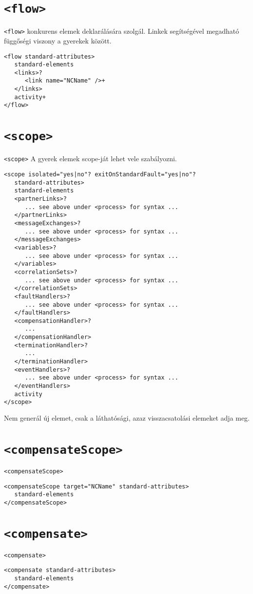 \section{\texttt{<flow>}}
\texttt{<flow>} konkurens elemek deklarálására szolgál. Linkek segítségével megadható függőségi viszony a gyerekek között. 
\begin{verbatim}
<flow standard-attributes>
   standard-elements
   <links>?
      <link name="NCName" />+
   </links>
   activity+
</flow>
\end{verbatim} 

\section{\texttt{<scope>}}
\texttt{<scope>} A gyerek elemek scope-ját lehet vele szabályozni.
\begin{verbatim}
<scope isolated="yes|no"? exitOnStandardFault="yes|no"?
   standard-attributes>
   standard-elements
   <partnerLinks>?
      ... see above under <process> for syntax ...
   </partnerLinks>
   <messageExchanges>?
      ... see above under <process> for syntax ...
   </messageExchanges>
   <variables>?
      ... see above under <process> for syntax ...
   </variables>
   <correlationSets>?
      ... see above under <process> for syntax ...
   </correlationSets>
   <faultHandlers>?
      ... see above under <process> for syntax ...
   </faultHandlers>
   <compensationHandler>?
      ...
   </compensationHandler>
   <terminationHandler>?
      ...
   </terminationHandler>
   <eventHandlers>?
      ... see above under <process> for syntax ...
   </eventHandlers>
   activity
</scope>
\end{verbatim}
Nem generál új elemet, csak a láthatósági, azaz visszacsatolási elemeket adja meg. 

\section{\texttt{<compensateScope>}}
\texttt{<compensateScope>}
\begin{verbatim}
<compensateScope target="NCName" standard-attributes>
   standard-elements
</compensateScope>
\end{verbatim}

\section{\texttt{<compensate>}}
\texttt{<compensate>}
\begin{verbatim}
<compensate standard-attributes>
   standard-elements
</compensate>
\end{verbatim}

